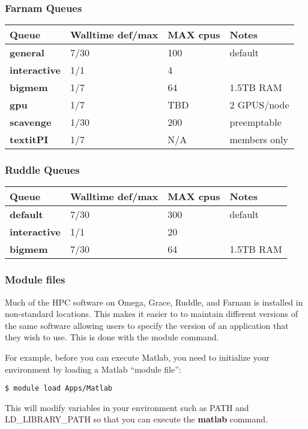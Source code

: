 \documentclass[10pt]{beamer}
\begin{document}
\begin{frame}

\frametitle{Farnam Queues}

\begin{tabular}{|l|l|l|l|}
\hline
\textbf{Queue} & \textbf{Walltime def/max}& \textbf{MAX cpus} & \textbf{Notes} \\
\hline
\textbf{general} & 7/30 &  100 & default \\
\hline
\textbf{interactive} & 1/1 & 4 &  \\
\hline
\textbf{bigmem} & 1/7 & 64 & 1.5TB RAM \\
\hline
\textbf{gpu} & 1/7 & TBD & 2 GPUS/node \\
\hline
\textbf{scavenge} & 1/30 & 200 & preemptable \\
\hline
\textbf{textit{PI}} & 1/7 & N/A & members only \\
\hline
\end{tabular}

\end{frame}

\begin{frame}
\frametitle{Ruddle Queues}

\begin{tabular}{|l|l|l|l|}
\hline
\textbf{Queue} & \textbf{Walltime def/max}& \textbf{MAX cpus} & \textbf{Notes} \\
\hline
\textbf{default} & 7/30 &  300 & default \\
\hline
\textbf{interactive} & 1/1 & 20 &  \\
\hline
\textbf{bigmem} & 7/30 & 64 & 1.5TB RAM \\
\hline
\end{tabular}

\end{frame}

\begin{frame}[fragile]
\frametitle{Module files}
Much of the HPC software on Omega, Grace, Ruddle, and Farnam 
is installed in non-standard
locations. This makes it easier to to maintain different versions of the same
software allowing users to specify the version of an application that
they wish to use.  This is done with the module command.

\vskip10pt
For example, before you can execute Matlab, you need to initialize your
environment by loading a Matlab ``module file'':

\begin{verbatim}
$ module load Apps/Matlab
\end{verbatim}

This will modify variables in your environment such as PATH and
LD\_LIBRARY\_PATH so that you can execute the \textbf{matlab} command.
\end{frame}
\end{document}
